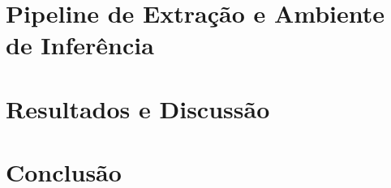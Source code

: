 \documentclass[
	12pt,		%
	a4paper,	%
	openright,  %
	oneside,	%
	chapter=TITLE,		%
	section=TITLE,		%
	english,	%
	brazilian   %
]{abntex2}
\begin{document}
\chapter{Pipeline de Extração e Ambiente de Inferência}
\label{cap:pipeline}


\chapter{Resultados e Discussão}
\label{cap:resultados}


\chapter{Conclusão}
\label{cap:conclusao}


\postextual

%


\end{document}
